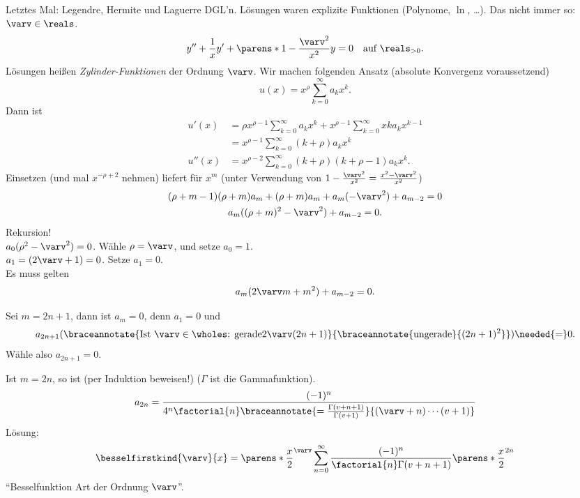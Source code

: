 Letztes Mal: Legendre, Hermite und Laguerre DGL'n. Lösungen waren explizite Funktionen (Polynome, \( \ln \), \dots). Das nicht immer so:
 \( \varv\in \reals \).
\begin{equation*}
  y''+\frac{1}{x}y'+\parens*{1-\frac{\varv^2}{x^2}}y=0\quad \text{auf }\reals_{>0}.
\end{equation*}
Lösungen heißen \emph{Zylinder-Funktionen} der Ordnung \( \varv \). Wir machen folgenden Ansatz (absolute Konvergenz voraussetzend)
\begin{equation*}
  u(x)=x^{\rho}\sum_{k=0}^{\infty}a_k x^k.
\end{equation*}
Dann ist
\begin{align*}
  u'(x)&=\rho x^{\rho-1}\sum_{k=0}^{\infty}a_k x^k+x^{\rho-1}\sum_{k=0}^{\infty}x k a_k x^{k-1}\\
  &=x^{\rho-1}\sum_{k=0}^{\infty}(k+\rho)a_k x^k\\
  u''(x)&=x^{\rho-2}\sum_{k=0}^{\infty}(k+\rho)(k+\rho-1)a_k x^k.
\end{align*}
Einsetzen (und mal \( x^{-\rho+2} \) nehmen) liefert für \( x^m \) (unter Verwendung von \( 1-\frac{\varv^2}{x^2}=\frac{x^2-\varv^2}{x^2} \))
\begin{gather*}
  (\rho+m-1)(\rho+m)a_m+(\rho+m)a_m+a_m(-\varv^2)+a_{m-2}=0\\
  a_m((\rho+m)^2-\varv^2)+a_{m-2}=0.
\end{gather*}
Rekursion! \\
\( a_0(\rho^2-\varv^2)=0 \). Wähle \( \rho=\varv \), und setze \( a_0=1 \). \\
\( a_1=(2\varv+1)=0 \). Setze \( a_1=0 \).\\
Es muss gelten
\begin{equation*}
  a_m(2\varv m+m^2)+a_{m-2}=0.
\end{equation*}

Sei \( m=2n+1 \), dann ist \( a_m=0 \), denn \( a_1=0 \) und
\begin{equation*}
  a_{2n+1}(\braceannotate{\text{Ist \( \varv\in\wholes \): gerade}{2\varv(2n+1)}}{\braceannotate{\text{ungerade}}{(2n+1)^2}})\needed{=}0.
\end{equation*}
Wähle also \( a_{2n+1}=0 \).

Ist \( m=2n \), so ist (per Induktion beweisen!) (\( \Gamma \) ist die Gammafunktion).
\begin{equation*}
  a_{2n}=\frac{(-1)^n}{4^n\factorial{n}\braceannotate{=\frac{\Gamma(v+n+1)}{\Gamma(v+1)}}{(\varv+n)\dotsm (v+1)}}
\end{equation*}
\timplies Lösung:
\begin{equation*}
  \besselfirstkind{\varv}{x}=\parens*{\frac{x}{2}}^{\varv}\sum_{n=0}^{\infty}\frac{(-1)^n}{\factorial{n}\Gamma(v+n+1)}\parens*{\frac{x}{2}}^{2n}
\end{equation*}
\enquote{Besselfunktion  Art der Ordnung \( \varv \)}.

